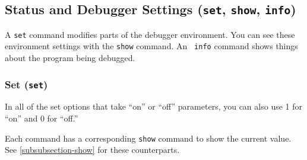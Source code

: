 \subsection{Status and Debugger Settings ({\tt set}, {\tt show}, {\tt info})\label{subsection-status}}

A {\tt set} command modifies parts of the debugger environment. You can
see these environment settings with the {\tt show} command.  An {\tt
info} command shows things about the program being debugged.

\subsubsection{Set ({\tt set})\label{subsubsection-set}}

In all of the set options that take ``on'' or ``off'' parameters, you
can also use 1 for ``on'' and 0 for ``off.''

Each command has a corresponding {\tt show} command to show the current
value. See \ref{subsubsection-show} for these counterparts.

